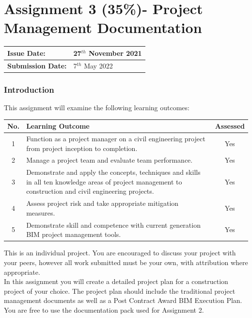 
	

\part*{Assignment 3 (35\%)- Project Management Documentation}


\begin{tabularx}{\textwidth}{ |X|X| }
	\hline
	\textbf{Issue Date:} & 27$^{th}$ November 2021\\
	\hline 
	\textbf{Submission Date:}  & 7$^{th}$ May 2022\\
	\hline
\end{tabularx}

\section*{Introduction}

This assignment will examine the following learning outcomes:\\

\begin{tabularx}{\textwidth}{ |c|X|c| }
	\hline
	\textbf{No.} & \textbf{Learning Outcome} & \textbf{Assessed} \\
	\hline 
	1  & Function as a project manager on a civil engineering project from project inception to completion. & Yes \\
	2  & Manage a project team and evaluate team performance. & Yes \\
	3  & Demonstrate and apply the concepts, techniques and skills in all ten knowledge areas of project management to construction and civil engineering projects. & Yes \\
	4  & Assess project risk and take appropriate mitigation measures. & Yes \\
	5  & Demonstrate skill and competence with current generation BIM project management tools. & Yes \\
	\hline
\end{tabularx}
\vspace{0.5cm}


This is an individual project.  You are encouraged to discuss your project with your peers, however all work submitted must be your own, with attribution where appropriate.\\

In this assignment you will create a detailed project plan for a construction project of your choice.  The project plan should include the traditional project management documents as well as a Post Contract Award BIM Execution Plan.  You are free to use the documentation pack used for Assignment 2.\\

